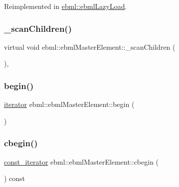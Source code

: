Reimplemented in \mbox{\hyperlink{classebml_1_1ebmlLazyLoad_a5f4ef095ca8d49b199e7d30bd917d30f}{ebml\+::ebml\+Lazy\+Load}}.

\mbox{\label{classebml_1_1ebmlMasterElement_a233be2f503f44d36608b16db5a2c3394}} 
\subsubsection{\texorpdfstring{\+\_\+scan\+Children()}{\_scanChildren()}}
{\footnotesize\ttfamily virtual void ebml\+::ebml\+Master\+Element\+::\+\_\+scan\+Children (\begin{DoxyParamCaption}\item[{\mbox{\hyperlink{classebml_1_1parseFile_1_1iterator}{parse\+File\+::iterator}} \&}]{ }\end{DoxyParamCaption})\hspace{0.3cm}{\ttfamily [protected]}, {\ttfamily [virtual]}}

\mbox{\label{classebml_1_1ebmlMasterElement_aee8637a10705708acad5add971ac6999}} 
\subsubsection{\texorpdfstring{begin()}{begin()}}
{\footnotesize\ttfamily \mbox{\hyperlink{classebml_1_1ebmlMasterElement_1_1iterator}{iterator}} ebml\+::ebml\+Master\+Element\+::begin (\begin{DoxyParamCaption}{ }\end{DoxyParamCaption})}

\mbox{\label{classebml_1_1ebmlMasterElement_af8869286e051067d82fad936eb0c7a74}} 
\subsubsection{\texorpdfstring{cbegin()}{cbegin()}}
{\footnotesize\ttfamily \mbox{\hyperlink{classebml_1_1ebmlMasterElement_1_1const__iterator}{const\+\_\+iterator}} ebml\+::ebml\+Master\+Element\+::cbegin (\begin{DoxyParamCaption}{ }\end{DoxyParamCaption}) const}

